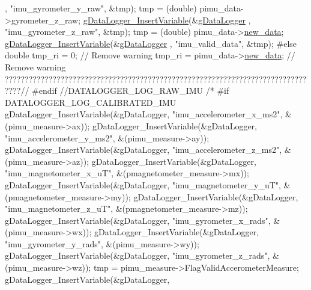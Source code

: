 \begin{DoxyCode}
      , \textcolor{stringliteral}{"imu\_gyrometer\_y\_raw"}, &tmp);
    tmp = (double) pimu\_data->gyrometer\_z\_raw;
    \hyperlink{gdatalogger_8c_a32674e7c2afa8b78e99a0070cf4bcaf9}{gDataLogger\_InsertVariable}(&\hyperlink{datalogger_01_07Caio-PC's_01conflicted_01copy_012012-11-23_08_8c_abe3b9c2c4e21e79c7b046b5986d13acc}{gDataLogger}
      , \textcolor{stringliteral}{"imu\_gyrometer\_z\_raw"}, &tmp);
    tmp = (double) pimu\_data->\hyperlink{structIMU__DATA__STRUCT_a99924252176326418863e511d4fa437b}{new\_data};
    \hyperlink{gdatalogger_8c_a32674e7c2afa8b78e99a0070cf4bcaf9}{gDataLogger\_InsertVariable}(&\hyperlink{datalogger_01_07Caio-PC's_01conflicted_01copy_012012-11-23_08_8c_abe3b9c2c4e21e79c7b046b5986d13acc}{gDataLogger}
      , \textcolor{stringliteral}{"imu\_valid\_data"}, &tmp);
\textcolor{preprocessor}{    #else}
\textcolor{preprocessor}{}    \textcolor{keywordtype}{double} tmp\_ri = 0; \textcolor{comment}{// Remove warning}
    tmp\_ri = pimu\_data->\hyperlink{structIMU__DATA__STRUCT_a99924252176326418863e511d4fa437b}{new\_data}; \textcolor{comment}{// Remove warning
       ????????????????????????????????????????????????????????????????????????????????//}
\textcolor{preprocessor}{    #endif //DATALOGGER\_LOG\_RAW\_IMU}
\textcolor{preprocessor}{}\textcolor{comment}{/*}
\textcolor{comment}{    #if DATALOGGER\_LOG\_CALIBRATED\_IMU}
\textcolor{comment}{    gDataLogger\_InsertVariable(&gDataLogger, "imu\_accelerometer\_x\_ms2",
       &(pimu\_measure->ax));}
\textcolor{comment}{    gDataLogger\_InsertVariable(&gDataLogger, "imu\_accelerometer\_y\_ms2",
       &(pimu\_measure->ay));}
\textcolor{comment}{    gDataLogger\_InsertVariable(&gDataLogger, "imu\_accelerometer\_z\_ms2",
       &(pimu\_measure->az));}
\textcolor{comment}{    gDataLogger\_InsertVariable(&gDataLogger, "imu\_magnetometer\_x\_uT",
       &(pmagnetometer\_measure->mx));}
\textcolor{comment}{    gDataLogger\_InsertVariable(&gDataLogger, "imu\_magnetometer\_y\_uT",
       &(pmagnetometer\_measure->my));}
\textcolor{comment}{    gDataLogger\_InsertVariable(&gDataLogger, "imu\_magnetometer\_z\_uT",
       &(pmagnetometer\_measure->mz));}
\textcolor{comment}{    gDataLogger\_InsertVariable(&gDataLogger, "imu\_gyrometer\_x\_rads",
       &(pimu\_measure->wx));}
\textcolor{comment}{    gDataLogger\_InsertVariable(&gDataLogger, "imu\_gyrometer\_y\_rads",
       &(pimu\_measure->wy));}
\textcolor{comment}{    gDataLogger\_InsertVariable(&gDataLogger, "imu\_gyrometer\_z\_rads",
       &(pimu\_measure->wz));}
\textcolor{comment}{    tmp = pimu\_measure->FlagValidAccerometerMeasure;}
\textcolor{comment}{    gDataLogger\_InsertVariable(&gDataLogger,
}
\end{DoxyCode}
